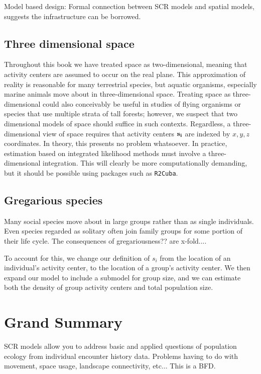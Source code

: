 Model based design: Formal connection between SCR models and spatial
models, suggests the infrastructure can be borrowed.

\subsection{Three dimensional space}

Throughout this book we have treated space as
two-dimensional, meaning that activity centers are assumed to occur on
the real plane. This approximation of reality is reasonable for many
terrestrial species, but aquatic organisms, especially marine animals
move about in three-dimensional space. Treating space as
three-dimensional could also conceivably be useful in studies of flying organisms
or species that use multiple strata of tall forests; however, we
suspect that two dimensional models of space should suffice in such
contexts. Regardless, a three-dimensional view of space requires that
activity centers $\bf s_i$ are indexed by
$x,y,z$ coordinates. In theory, this presents no problem whatsoever. In
practice, estimation based on integrated likelihood methods must
involve a three-dimensional integration. This will clearly be more
computationally demanding, but it should be possible using packages
such as {\tt R2Cuba}.




\subsection{Gregarious species}

Many social species move about in large groups rather than as single
individuals. Even species regarded as solitary often join family
groups for some portion of their life cycle. The consequences of
gregariousness?? are x-fold....

To account for this, we change our definition of $s_i$ from the
location of an individual's activity center, to the location of a
group's activity center. We then expand our model to include a
submodel for group size, and we can estimate both the density of group
activity centers and total population size.


\section{Grand Summary}


SCR models allow you to address basic and applied questions of
population ecology from individual encounter history data. Problems
having to do with movement, space usage, landscape connectivity,
etc... This is a BFD. 

